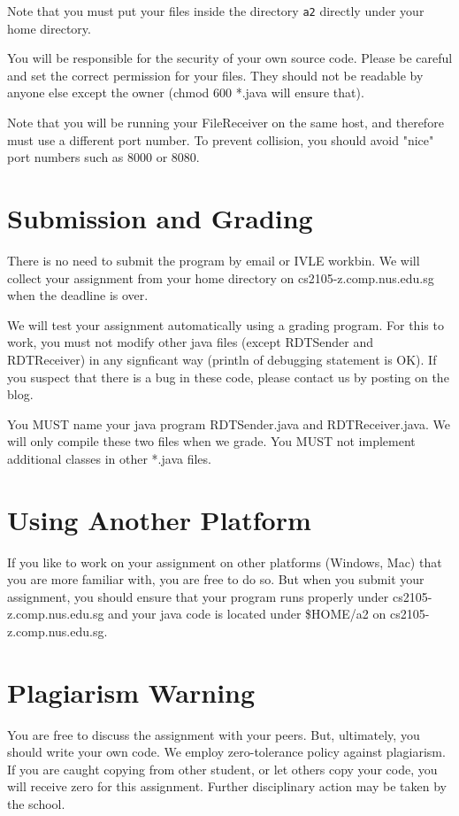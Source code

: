 \documentclass[a4paper,11pt]{exam}
\begin{document}
Note that you must put your files inside the directory \texttt{a2} directly under your home directory. 

You will be responsible for the security of your own source code. Please be careful and set the correct permission for your files. They should not be readable by anyone else except the owner (chmod 600 *.java will ensure that).

Note that you will be running your FileReceiver on the same host, and therefore must use a different port number. To prevent collision, you should avoid "nice" port numbers such as 8000 or 8080.

\section*{Submission and Grading}

There is no need to submit the program by email or IVLE workbin. We will collect your assignment from your home directory on cs2105-z.comp.nus.edu.sg when the deadline is over.

We will test your assignment automatically using a grading program. For this to work, you must not modify other java files (except RDTSender and RDTReceiver) in any signficant way (println of debugging statement is OK).  If you suspect that there is a bug in these code, please contact us by posting on the blog.  

You MUST name your java program RDTSender.java and RDTReceiver.java.  We will only compile these two files when we grade. You MUST not implement additional classes in other *.java files.

\section*{Using Another Platform}

If you like to work on your assignment on other platforms (Windows, Mac) that you are more familiar with, you are free to do so. But when you submit your assignment, you should ensure that your program runs properly under cs2105-z.comp.nus.edu.sg and your java code is located under \$HOME/a2 on cs2105-z.comp.nus.edu.sg.

\section*{Plagiarism Warning}

You are free to discuss the assignment with your peers. But, ultimately, you should write your own code. We employ zero-tolerance policy against plagiarism. If you are caught copying from other student, or let others copy your code, you will receive zero for this assignment. Further disciplinary action may be taken by the school.
\end{document}
